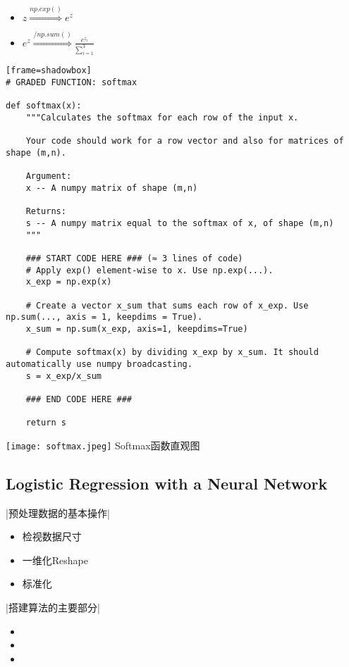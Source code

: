 \documentclass[UTF_8]{ctexart}
\begin{document}
\begin{itemize}
	\item $z \stackrel{np.exp()}\Longrightarrow e^{z} $
	\item $ e^{z}\stackrel{/np.sum()}\Longrightarrow \frac{e^{z_i}}{\sum\limits^{3}_{i=1}} $
		
\end{itemize}
\begin{lstlisting}[title={Softmax:$S(z)=\frac{e^{z_i}}{\sum\limits^{n}_{i=1}e^{z_i}}$}][frame=shadowbox]
# GRADED FUNCTION: softmax

def softmax(x):
    """Calculates the softmax for each row of the input x.

    Your code should work for a row vector and also for matrices of shape (m,n).

    Argument:
    x -- A numpy matrix of shape (m,n)

    Returns:
    s -- A numpy matrix equal to the softmax of x, of shape (m,n)
    """
    
    ### START CODE HERE ### (≈ 3 lines of code)
    # Apply exp() element-wise to x. Use np.exp(...).
    x_exp = np.exp(x)

    # Create a vector x_sum that sums each row of x_exp. Use np.sum(..., axis = 1, keepdims = True).
    x_sum = np.sum(x_exp, axis=1, keepdims=True)
    
    # Compute softmax(x) by dividing x_exp by x_sum. It should automatically use numpy broadcasting.
    s = x_exp/x_sum

    ### END CODE HERE ###
    
    return s
\end{lstlisting}


\centering
\texttt{[image: softmax.jpeg]}
Softmax函数直观图

\clearpage
\subsection{Logistic Regression with a Neural Network}
\centerline{|预处理数据的基本操作|}
\begin{itemize}
		\item 检视数据尺寸
		\item 一维化Reshape
		\item 标准化
		
\end{itemize}

\centerline{|搭建算法的主要部分|}
\begin{itemize}
		\item 
		\item 
		\item 
		
\end{itemize}
\end{document}
